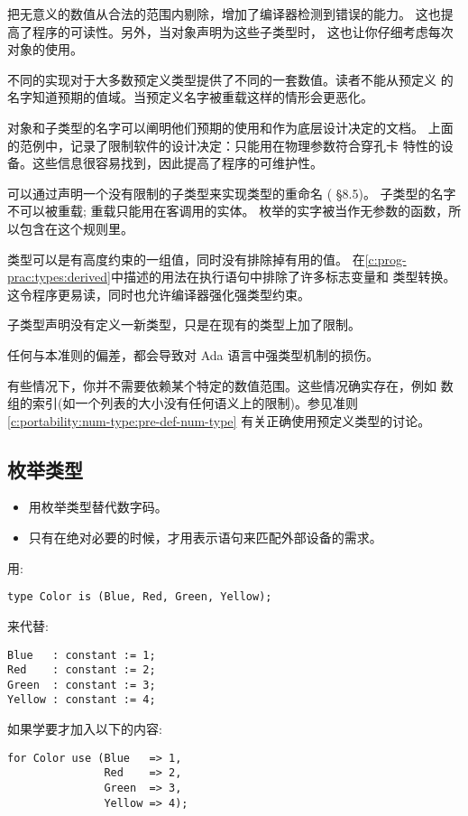 \begin{blockindent}
把无意义的数值从合法的范围内剔除，增加了编译器检测到错误的能力。
这也提高了程序的可读性。另外，当对象声明为这些子类型时，
这也让你仔细考虑每次对象的使用。

不同的实现对于大多数预定义类型提供了不同的一套数值。读者不能从预定义
的名字知道预期的值域。当预定义名字被重载这样的情形会更恶化。

对象和子类型的名字可以阐明他们预期的使用和作为底层设计决定的文档。
上面的范例中，记录了限制软件的设计决定：只能用在物理参数符合穿孔卡
特性的设备。这些信息很容易找到，因此提高了程序的可维护性。

可以通过声明一个没有限制的子类型来实现类型的重命名 (\cite{arm95} \S{}8.5)。
子类型的名字不可以被重载; 重载只能用在客调用的实体。
枚举的实字被当作无参数的函数，所以包含在这个规则里。

类型可以是有高度约束的一组值，同时没有排除掉有用的值。
在\ref{c:prog-prac:types:derived}中描述的用法在执行语句中排除了许多标志变量和
类型转换。这令程序更易读，同时也允许编译器强化强类型约束。
\end{blockindent}

\begin{blockindent}
子类型声明没有定义一新类型，只是在现有的类型上加了限制。

任何与本准则的偏差，都会导致对 Ada 语言中强类型机制的损伤。
\end{blockindent}


\begin{blockindent}
有些情况下，你并不需要依赖某个特定的数值范围。这些情况确实存在，例如
数组的索引(如一个列表的大小没有任何语义上的限制)。参见准则
\ref{c:portability:num-type:pre-def-num-type} 有关正确使用预定义类型的讨论。
\end{blockindent}

\subsection{枚举类型}
\begin{itemize}
\item 用枚举类型替代数字码。
\item 只有在绝对必要的时候，才用表示语句来匹配外部设备的需求。
\end{itemize}

\begin{blockindent}
用:
\begin{lstlisting}
type Color is (Blue, Red, Green, Yellow);
\end{lstlisting}
来代替:
\begin{lstlisting}
Blue   : constant := 1;
Red    : constant := 2;
Green  : constant := 3;
Yellow : constant := 4;
\end{lstlisting}
如果学要才加入以下的内容:
\begin{lstlisting}
for Color use (Blue   => 1,
               Red    => 2,
               Green  => 3,
               Yellow => 4);
\end{lstlisting}
\end{blockindent}

